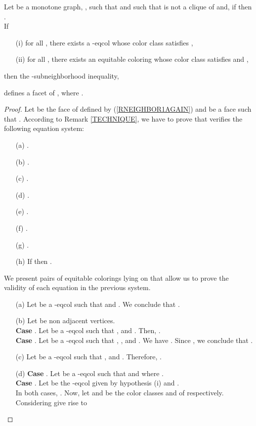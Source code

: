\begin{tthm} \label{TNEIGHBOR1}
Let  be a monotone graph, ,  such that 
and  such that  is not a clique of  and, if  then .\\
If
\begin{enumerate}
\item[(i)] for all , there exists a
-eqcol whose color class  satisfies ,
\item[(ii)] for all , there exists an equitable coloring whose color class  satisfies
 and ,
\end{enumerate}
then the -subneighborhood inequality, \ie

defines a facet of , where
.
\end{tthm}
\begin{proof}
Let  be the face of  defined by (\ref{RNEIGHBOR1AGAIN}) and
 be a face such that .
According to Remark \ref{TECHNIQUE}, we have to prove that  verifies the following equation system: 
\begin{enumerate}
\item[(a)] .
\item[(b)] .
\item[(c)] .
\item[(d)] .
\item[(e)] .
\item[(f)] .
\item[(g)] .
\item[(h)] If  then
           .
\end{enumerate}
We present pairs of equitable colorings lying on  that allow us to
prove the validity of each equation in the previous system.
\begin{enumerate}
\item[(a)] Let  be a -eqcol such that  and . We conclude that
. 
\item[(b)] Let  be non adjacent vertices.\\
\textbf{Case }. Let  be a -eqcol such that , 
and . Then, .\\
\textbf{Case }. Let  be a -eqcol such that , ,  and
. We have .
Since , we conclude that
.
\item[(c)] Let  be a -eqcol such that ,  and .
Therefore, .
\item[(d)] \textbf{Case }. Let  be a -eqcol such that  and
 where .\\
\textbf{Case }. Let  be the -eqcol given
by hypothesis (i) and .\\
In both cases, . Now, let  and  be the color classes 
and  of  respectively. Considering  give rise to


\end{enumerate}
\end{proof}
